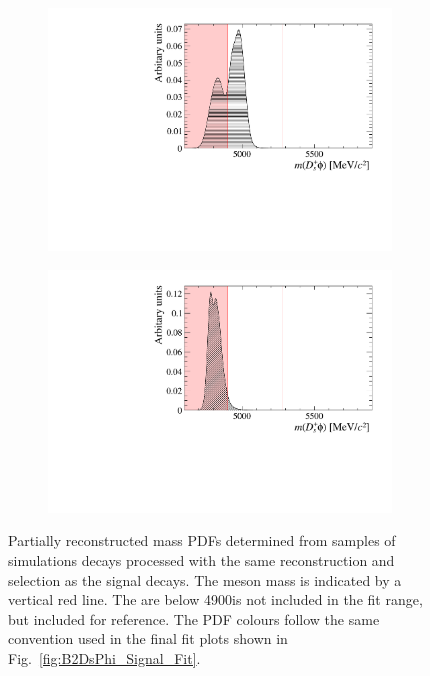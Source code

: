 \begin{figure}[!h]
\begin{subfigure}[t]{0.49\textwidth}
        \includegraphics[width=1.0\textwidth]{figs/B2DsPhi/Bs2DsDs_4600_5900_Shape.pdf}
        \caption{\decay{\Bsb}{\Dsp\Dsm} }
    \end{subfigure}
    \begin{subfigure}[t]{0.49\textwidth}
        \includegraphics[width=1.0\textwidth]{figs/B2DsPhi/Bs2DsstDs_4600_5900_Shape.pdf}
        \caption{\decay{\Bsb}{\Dssp\Dsm} }
    \end{subfigure}
    \caption{Partially reconstructed mass PDFs determined from samples of simulations decays processed with the same reconstruction and selection as the signal decays. The \Bp meson mass is indicated by a vertical red line. The are below 4900\mevcc is not included in the fit range, but included for reference. The PDF colours follow the same convention used in the final fit plots shown in Fig.~\ref{fig:B2DsPhi_Signal_Fit}.}
    \label{fig:B2DsPhi_part_reco_shapes}   
\end{figure}



